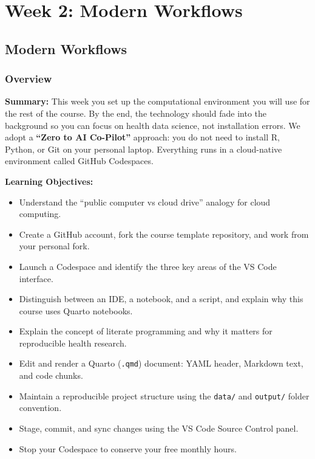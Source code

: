 \documentclass[
  letterpaper,
  DIV=11,
  numbers=noendperiod,
  oneside]{scrreprt}
\providecommand{\tightlist}{%
  \setlength{\itemsep}{0pt}\setlength{\parskip}{0pt}}
\begin{document}
\part{Week 2: Modern Workflows}

\chapter*{Modern Workflows}\label{modern-workflows}


\section*{Overview}\label{overview-1}


\textbf{Summary:} This week you set up the computational environment you
will use for the rest of the course. By the end, the technology should
fade into the background so you can focus on health data science, not
installation errors. We adopt a \textbf{``Zero to AI Co-Pilot''}
approach: you do not need to install R, Python, or Git on your personal
laptop. Everything runs in a cloud-native environment called GitHub
Codespaces.

\textbf{Learning Objectives:}

\begin{itemize}
\tightlist
\item
  Understand the ``public computer vs cloud drive'' analogy for cloud
  computing.
\item
  Create a GitHub account, fork the course template repository, and work
  from your personal fork.
\item
  Launch a Codespace and identify the three key areas of the VS Code
  interface.
\item
  Distinguish between an IDE, a notebook, and a script, and explain why
  this course uses Quarto notebooks.
\item
  Explain the concept of literate programming and why it matters for
  reproducible health research.
\item
  Edit and render a Quarto (\texttt{.qmd}) document: YAML header,
  Markdown text, and code chunks.
\item
  Maintain a reproducible project structure using the \texttt{data/} and
  \texttt{output/} folder convention.
\item
  Stage, commit, and sync changes using the VS Code Source Control
  panel.
\item
  Stop your Codespace to conserve your free monthly hours.
\end{itemize}
\end{document}
